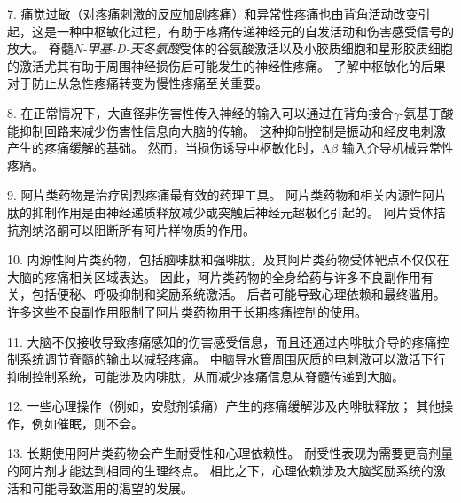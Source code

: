 7. 痛觉过敏（对疼痛刺激的反应加剧疼痛）和异常性疼痛也由背角活动改变引起，这是一种中枢敏化过程，有助于疼痛传递神经元的自发活动和伤害感受信号的放大。
脊髓\textit{N-甲基-D-天冬氨酸}受体的谷氨酸激活以及小胶质细胞和星形胶质细胞的激活尤其有助于周围神经损伤后可能发生的神经性疼痛。
了解中枢敏化的后果对于防止从急性疼痛转变为慢性疼痛至关重要。 


8. 在正常情况下，大直径非伤害性传入神经的输入可以通过在背角接合$\gamma$-氨基丁酸能抑制回路来减少伤害性信息向大脑的传输。
这种抑制控制是振动和经皮电刺激产生的疼痛缓解的基础。
然而，当损伤诱导中枢敏化时，A$\beta$ 输入介导机械异常性疼痛。
 

9. 阿片类药物是治疗剧烈疼痛最有效的药理工具。
阿片类药物和相关内源性阿片肽的抑制作用是由神经递质释放减少或突触后神经元超极化引起的。
阿片受体拮抗剂纳洛酮可以阻断所有阿片样物质的作用。 


10. 内源性阿片类药物，包括脑啡肽和强啡肽，及其阿片类药物受体靶点不仅仅在大脑的疼痛相关区域表达。
因此，阿片类药物的全身给药与许多不良副作用有关，包括便秘、呼吸抑制和奖励系统激活。
后者可能导致心理依赖和最终滥用。
许多这些不良副作用限制了阿片类药物用于长期疼痛控制的使用。


11. 大脑不仅接收导致疼痛感知的伤害感受信息，而且还通过内啡肽介导的疼痛控制系统调节脊髓的输出以减轻疼痛。
中脑导水管周围灰质的电刺激可以激活下行抑制控制系统，可能涉及内啡肽，从而减少疼痛信息从脊髓传递到大脑。


12. 一些心理操作（例如，安慰剂镇痛）产生的疼痛缓解涉及内啡肽释放；
其他操作，例如催眠，则不会。


13. 长期使用阿片类药物会产生耐受性和心理依赖性。
耐受性表现为需要更高剂量的阿片剂才能达到相同的生理终点。
相比之下，心理依赖涉及大脑奖励系统的激活和可能导致滥用的渴望的发展。

